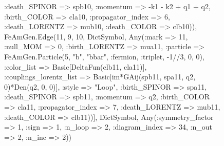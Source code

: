 \documentclass{revtex4}
\begin{document}
\begin{figure}[!htb]
\begin{center}
{:death_SPINOR => spb10, :momentum => -k1 - k2 + q1 + q2, :birth_COLOR => cla10, :propagator_index => 6, :death_LORENTZ => mub10, :death_COLOR => clb10)), FeAmGen.Edge(11, 9, 10, Dict{Symbol, Any}(:mark => 11, :null_MOM => 0, :birth_LORENTZ => mua11, :particle => FeAmGen.Particle(5, "b", "bbar", :fermion, :triplet, -1//3, 0, 0), :color_list => Basic[DeltaFun(clb11, cla11)], :couplings_lorentz_list => Basic[im*GAij(spb11, spa11, q2, 0)*Den(q2, 0, 0)], :style => "Loop", :birth_SPINOR => spa11, :death_SPINOR => spb11, :momentum => q2, :birth_COLOR => cla11, :propagator_index => 7, :death_LORENTZ => mub11, :death_COLOR => clb11))], Dict{Symbol, Any}(:symmetry_factor => 1, :sign => 1, :n_loop => 2, :diagram_index => 34, :n_out => 2, :n_inc => 2)) 
}
\end{center}
\end{figure}
\end{document}
